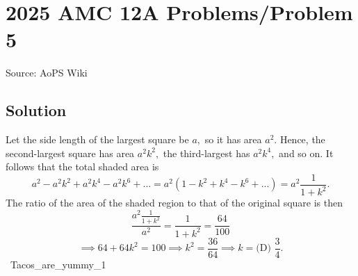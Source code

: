 \documentclass[12pt]{article}
\begin{document}
\section*{{2025 AMC 12A Problems/Problem 5}}
Source: AoPS Wiki

\subsection*{Solution}
Let the side length of the largest square be $a,$ so it has area $a^2.$ Hence, the second-largest square has area $a^2k^2,$ the third-largest has $a^2k^4,$ and so on. It follows that the total shaded area is \[a^2-a^2k^2+a^2k^4-a^2k^6+...=a^2(1-k^2+k^4-k^6+...)=a^2\dfrac{1}{1+k^2}.\] The ratio of the area of the shaded region to that of the original square is then \[\dfrac{a^2\frac{1}{1+k^2}}{a^2}=\dfrac{1}{1+k^2}=\dfrac{64}{100}\] \[\implies 64+64k^2=100\implies k^2=\dfrac{36}{64}\implies k=\boxed{\text{(D) }\dfrac{3}{4}}.\] ~Tacos_are_yummy_1
\end{document}
